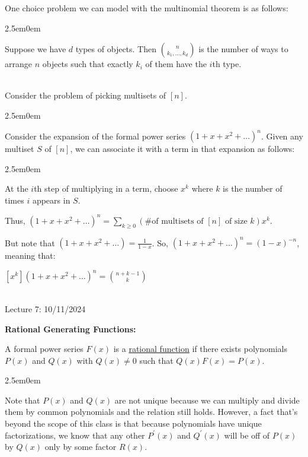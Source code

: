 \documentclass{book}
\newcommand{\hTwo}{%
\color{MidnightBlue}%
   \fontsize{13}{15}\selectfont%
}
\newcommand{\hThree}{%
   \color{PineGreen!85!Orange}
   \fontsize{12}{14}\selectfont%
}
\newcommand{\teachComment}{
   \color{Orange}%
   \fontsize{12}{14}\selectfont%
}
\newenvironment{myIndent}{%
   \begin{adjustwidth}{2.5em}{0em}%
}{%
   \end{adjustwidth}%
}
\newcommand{\udefine}[1]{{%
   \setulcolor{Red}%
   \setul{0.14em}{0.07em}%
   \ul{#1}%
}}
\newcommand{\blab}[1]{\textbf{#1}}
\newcommand{\mySepTwo}[1][.]{%
   {\noindent\color{#1}{\rule{6.5in}{0.5mm}}}\\%
}
\newcommand{\retTwo}{\hfill\bigbreak}
\newcommand{\mHeader}[1]{{
   \color{Black}%
   \fontsize{20}{18}\selectfont%
   #1\retTwo
}}
\begin{document}
One choice problem we can model with the multinomial theorem is as follows:

\begin{myIndent}\hTwo
   Suppose we have $d$ types of objects. Then $\binom{n}{k_1, \ldots, k_d}$ is the number of ways to arrange $n$ objects such that exactly $k_i$ of them have the $i$th type.\retTwo
\end{myIndent}

\mySepTwo

Consider the problem of picking multisets of $[n]$.
\begin{myIndent}\hTwo
   Consider the expansion of the formal power series $(1 + x + x^2 + \ldots)^n$. Given any multiset $S$ of $[n]$, we can associate it with a term in that expansion as follows:
   \begin{myIndent}\hThree
      At the $i$th step of multiplying in a term, choose $x^k$ where $k$ is the number of times $i$ appears in $S$.\retTwo
   \end{myIndent}

   Thus, $(1 + x + x^2 + \ldots)^n = \sum\limits_{k\geq0}(\text{\# of multisets of }[n]\text{ of size }k)x^k$.\retTwo

   But note that $(1 + x + x^2 + \ldots) = \frac{1}{1-x}$. So, $(1 + x + x^2 + \ldots)^n = (1 - x)^{-n}$,\\ meaning that:

   {\centering $[x^k](1 + x + x^2 + \ldots)^n = \binom{n + k - 1}{k}$\retTwo\par}
\end{myIndent}

\mySepTwo

\mHeader{Lecture 7: 10/11/2024}

\blab{Rational Generating Functions:}

A formal power series $F(x)$ is a \udefine{rational function} if there exists polynomials $P(x)$ and $Q(x)$ with $Q(x) \neq 0$ such that $Q(x)F(x) = P(x)$.

\begin{myIndent}\teachComment
   Note that $P(x)$ and $Q(x)$ are not unique because we can multiply and divide them by common polynomials and the relation still holds. However, a fact that's beyond the scope of this class is that because polynomials have unique factorizations, we know that any other $P^\prime(x)$ and $Q^\prime(x)$ will be off of $P(x)$ by $Q(x)$ only by some factor $R(x)$.\retTwo
\end{myIndent}
\end{document}
